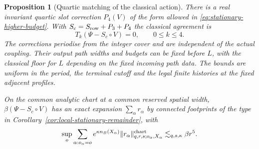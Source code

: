 \documentclass[11pt,reqno]{amsart}
\numberwithin{equation}{section}
\newtheorem{proposition}[theorem]{Proposition}
\theoremstyle{definition}
\theoremstyle{remark}
\begin{document}
\begin{proposition}[Quartic matching of the classical action]
\label{prop:quartic-curvature-matching}
There is a real invariant quartic slot correction \(P_4(V)\)
of the form allowed in \eqref{eq:stationary-higher-budget}.
With \(S_c=S_{\rm row}+P_3+P_4\) the classical agreement is
\begin{equation}
                T_k(\Psi-S_c\circ V)=0,\qquad 0\le k\le4 .
 \label{eq:quartic-matching}
\end{equation}
The corrections periodise from the integer cover and are
independent of the actual coupling. Their output path
widths and budgets can be fixed before \(L\), with the
classical floor for \(L\) depending on the fixed incoming
path data. The bounds are uniform in the period, the
terminal cutoff and the legal finite histories at the
fixed adjacent profiles.

On the common analytic chart at a common reserved spatial
width, \(\beta(\Psi-S_c\circ V)\) has an exact expansion
\(\sum_\alpha r_\alpha\) by connected footprints of the type in
Corollary~\ref{cor:local-stationary-remainder}, with
\begin{equation}
 \sup_o\sum_{\alpha:o_\alpha=o}e^{\kappa n_B(X_\alpha)}
    \|r_\alpha\|^{\rm chart}_{q,r,s;o_\alpha,X_\alpha}
                    \lesssim_{q,s,\kappa}\beta r^5 .
 \label{eq:quartic-matching-remainder}
\end{equation}
\end{proposition}
\end{document}
